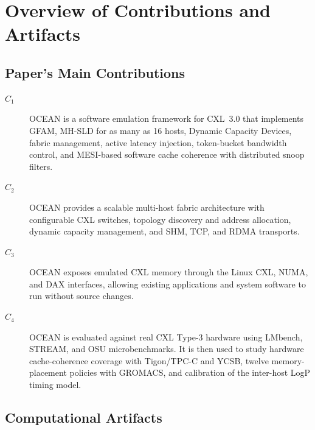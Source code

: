 \documentclass[conference]{IEEEtran}
\begin{document}
\raggedbottom



\appendixAD

\section{Overview of Contributions and Artifacts}

\subsection{Paper's Main Contributions}

\begin{description}
\item[$C_1$] OCEAN is a software emulation framework for CXL~3.0 that
implements GFAM, MH-SLD for as many as 16 hosts, Dynamic Capacity Devices,
fabric management, active latency injection, token-bucket bandwidth control,
and MESI-based software cache coherence with distributed snoop filters.

\item[$C_2$] OCEAN provides a scalable multi-host fabric architecture with
configurable CXL switches, topology discovery and address allocation, dynamic
capacity management, and SHM, TCP, and RDMA transports.

\item[$C_3$] OCEAN exposes emulated CXL memory through the Linux CXL, NUMA,
and DAX interfaces, allowing existing applications and system software to run
without source changes.

\item[$C_4$] OCEAN is evaluated against real CXL Type-3 hardware using
LMbench, STREAM, and OSU microbenchmarks.  It is then used to study hardware
cache-coherence coverage with Tigon/TPC-C and YCSB, twelve memory-placement
policies with GROMACS, and calibration of the inter-host LogP timing model.
\end{description}

\subsection{Computational Artifacts}
\end{document}
